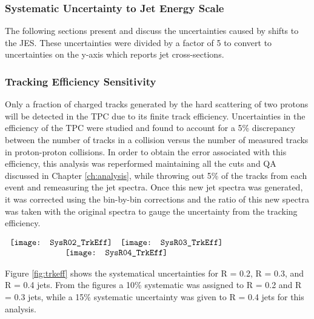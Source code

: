 \subsubsection{Systematic Uncertainty to Jet Energy Scale}

The following sections present and discuss the uncertainties caused by shifts to the JES.  These uncertainties were divided by a factor of 5 to convert to uncertainties on the y-axis which reports jet cross-sections.

\subsubsection{Tracking Efficiency Sensitivity}
Only a fraction of charged tracks generated by the hard scattering of two protons will be detected in the TPC due to its finite track efficiency.  Uncertainties in the efficiency of the TPC were studied and found to account for a 5\% discrepancy\cite{Abelev:2013ala} between the number of tracks in a collision versus the number of measured tracks in proton-proton collisions.  In order to obtain the error associated with this efficiency, this analysis was reperformed maintaining all the cuts and QA discussed in Chapter \ref{ch:analysis}, while throwing out 5\% of the tracks from each event and remeasuring the jet spectra.  Once this new jet spectra was generated, it was corrected using the bin-by-bin corrections and the ratio of this new spectra was taken with the original spectra to gauge the uncertainty from the tracking efficiency.


\begin{figure*}[t!]
$\begin{array}{rl}
    \texttt{[image: SysR02\_TrkEff]} &
    \texttt{[image: SysR03\_TrkEff]}\\
    \multicolumn{2}{c}{\texttt{[image: SysR04\_TrkEff]}}
\end{array}$
\caption[Systematic due to TPC tracking efficiency.]{\label{fig:trkeff}Systematic due to TPC tracking efficiency; R = 0.2 \textit{(top left)}, R = 0.3 \textit{(top right)}, R = 0.4 \textit{(bottom)}.}
\end{figure*}

\noindent
Figure \ref{fig:trkeff} shows the systematical uncertainties for R = 0.2, R = 0.3, and R = 0.4 jets.  From the figures a 10\% systematic was assigned to R = 0.2 and R = 0.3 jets, while a 15\% systematic uncertainty was given to R = 0.4 jets for this analysis.

